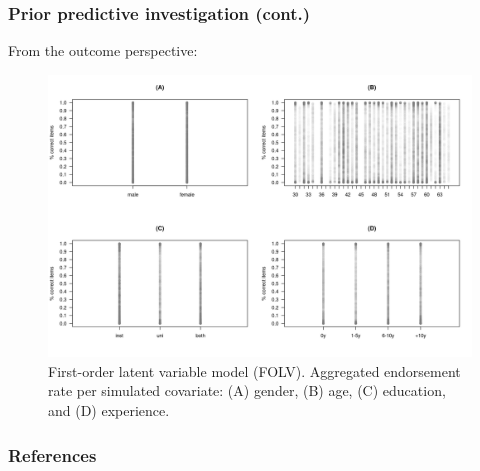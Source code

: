 \documentclass[arial,12pt,xcolor=dvipsnames]{beamer}
\begin{document}
%
\begin{frame}
	\frametitle{Prior predictive investigation (cont.)}
	From the outcome perspective:
	\begin{figure}[h]
		\centering
		\includegraphics[width=0.65\linewidth]{FOLV_HitRate2}
		\caption{First-order latent variable model (FOLV). Aggregated endorsement rate per simulated covariate: (A) gender, (B) age, (C) education, and (D) experience.}
		\label{fig:FOLV_hitrate2}
	\end{figure}
\end{frame}
%
%
%
\begin{frame}[allowframebreaks]
\frametitle{References}
%


%
\end{frame}
%
%
\end{document}
